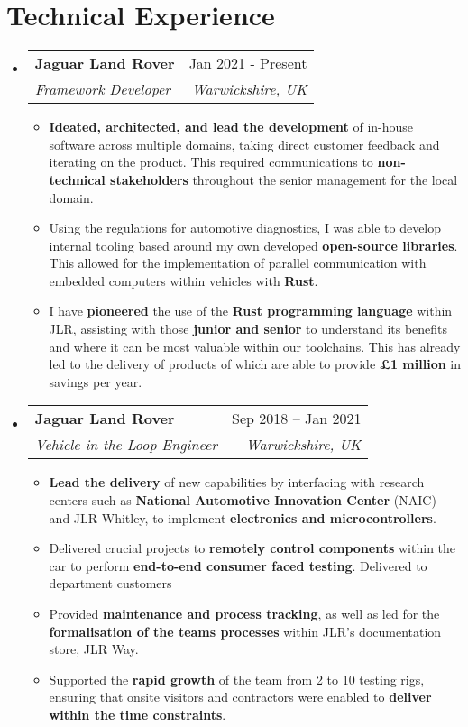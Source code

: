\documentclass[letterpaper,11pt]{article}
\makeatletter
\newcommand{\resumeItem}[1]{
  \item\small{
    {#1 \vspace{-2pt}}
  }
}
\newcommand{\resumeSubheading}[4]{
  \vspace{-2pt}\item
    \begin{tabular*}{0.97\textwidth}[t]{l@{\extracolsep{\fill}}r}
      \textbf{#1} & #2 \\
      \textit{\small#3} & \textit{\small #4} \\
    \end{tabular*}\vspace{-7pt}
}
\newcommand{\resumeSubHeadingListStart}{\begin{itemize}[leftmargin=0.15in, label={}]}
\newcommand{\resumeSubHeadingListEnd}{\end{itemize}}
\newcommand{\resumeItemListStart}{\begin{itemize}}
\newcommand{\resumeItemListEnd}{\end{itemize}\vspace{-5pt}}
\makeatother
\begin{document}
\section{Technical Experience}
  \resumeSubHeadingListStart
    \resumeSubheading
      {Jaguar Land Rover}{Jan 2021 - Present}
      {Framework Developer}{Warwickshire, UK}
      \resumeItemListStart
        \resumeItem{\textbf{Ideated, architected, and lead the development} of in-house software across multiple domains, taking direct customer feedback and iterating on the product. This required communications to \textbf{non-technical stakeholders} throughout the senior management for the local domain.}
        \resumeItem{Using the regulations for automotive diagnostics, I was able to develop internal tooling based around my own developed \textbf{open-source libraries}. This allowed for the implementation of parallel communication with embedded computers within vehicles with \textbf{Rust}.}
        \resumeItem{I have \textbf{pioneered} the use of the \textbf{Rust programming language} within JLR, assisting with those \textbf{junior and senior} to understand its benefits and where it can be most valuable within our toolchains. This has already led to the delivery of products of which are able to provide \textbf{£1 million} in savings per year.}
      \resumeItemListEnd
    \resumeSubheading
      {Jaguar Land Rover}{Sep 2018 -- Jan 2021}
      {Vehicle in the Loop Engineer}{Warwickshire, UK}
      \resumeItemListStart
        \resumeItem{\textbf{Lead the delivery} of new capabilities by interfacing with research centers such as \textbf{National Automotive Innovation Center} (NAIC) and JLR Whitley, to implement \textbf{electronics and microcontrollers}.}
        \resumeItem{Delivered crucial projects to \textbf{remotely control components} within the car to perform \textbf{end-to-end consumer faced testing}. Delivered to department customers}
        \resumeItem{Provided \textbf{maintenance and process tracking}, as well as led for the \textbf{formalisation of the teams processes} within JLR's documentation store, JLR Way.}
        \resumeItem{Supported the \textbf{rapid growth} of the team from 2 to 10 testing rigs, ensuring that onsite visitors and contractors were enabled to \textbf{deliver within the time constraints}.}
      \resumeItemListEnd
  \resumeSubHeadingListEnd
\end{document}
